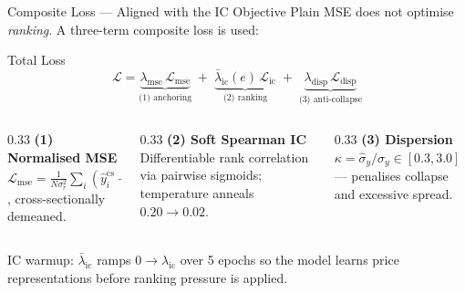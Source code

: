 \documentclass[aspectratio=169, 10pt]{beamer}
\begin{document}
\begin{frame}{Composite Loss — Aligned with the IC Objective}
  Plain MSE does not optimise \emph{ranking}. A three-term composite loss is used:
  \begin{block}{Total Loss}
    \vspace{-0.4em}
    \[
      \mathcal{L}=\underbrace{\lambda_\text{mse}\,\mathcal{L}_\text{mse}}_{\text{(1) anchoring}}
      \;+\;\underbrace{\bar\lambda_\text{ic}(e)\,\mathcal{L}_\text{ic}}_{\text{(2) ranking}}
      \;+\;\underbrace{\lambda_\text{disp}\,\mathcal{L}_\text{disp}}_{\text{(3) anti-collapse}}
    \]
  \end{block}
  \begin{columns}[T]
    \begin{column}{0.33\textwidth}
      \small\textbf{(1) Normalised MSE}\\
      $\mathcal{L}_\text{mse}=\frac{1}{N\sigma_r^2}\sum_i(\hat y^\text{cs}_i-y^\text{cs}_i)^2$,
      cross-sectionally demeaned.
    \end{column}
    \begin{column}{0.33\textwidth}
      \small\textbf{(2) Soft Spearman IC}\\
      Differentiable rank correlation via pairwise sigmoids; temperature
      anneals $0.20\!\to\!0.02$.
    \end{column}
    \begin{column}{0.33\textwidth}
      \small\textbf{(3) Dispersion}\\
      $\kappa=\hat\sigma_y/\sigma_y\in[0.3,3.0]$ — penalises collapse
      and excessive spread.
    \end{column}
  \end{columns}
  \smallskip
  \footnotesize
  \alert{IC warmup}: $\bar\lambda_\text{ic}$ ramps $0\!\to\!\lambda_\text{ic}$ over 5 epochs so the model
  learns price representations before ranking pressure is applied.
\end{frame}
\end{document}
